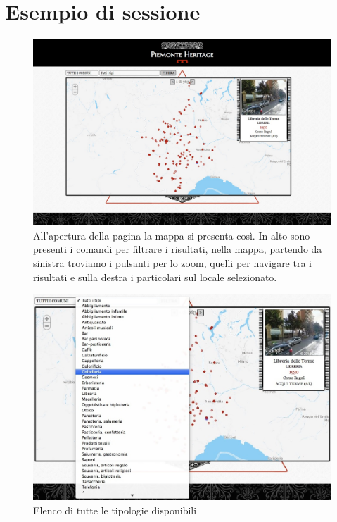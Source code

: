 \chapter{Esempio di sessione}%

\begin{figure}[ht!]
	\caption{All'apertura della pagina la mappa si presenta cos\`i. In alto sono presenti i comandi per filtrare i risultati, nella mappa, partendo da sinistra troviamo i pulsanti per lo zoom, quelli per navigare tra i risultati e sulla destra i particolari sul locale selezionato.}
	\centering
		\includegraphics[width=\textwidth]{img/s1.jpg}
\end{figure}

\begin{figure}[ht!]
	\caption{Elenco di tutte le tipologie disponibili}
	\centering
		\includegraphics[width=\textwidth]{img/s2.jpg}
\end{figure}

